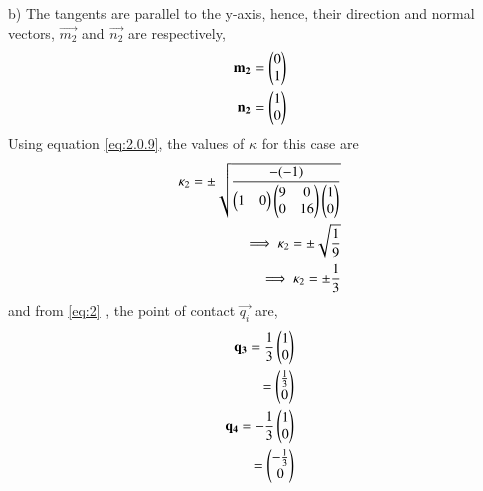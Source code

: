 \documentclass[journal,12pt,twocolumn]{IEEEtran}
\begin{document}
b) The tangents are parallel to the y-axis, hence, their direction and normal vectors, $\vec{m_2}$ and $\vec{n_2}$ are respectively,
\begin{align}
\mathbf{m_2}=\begin{pmatrix}0\\1\end{pmatrix}\\
\mathbf{n_2}=\begin{pmatrix}1\\0\end{pmatrix}
\end{align}
Using equation \eqref{eq:2.0.9}, the values of $\kappa$ for this case are
\begin{align}
     \kappa_2=\pm \sqrt{\frac{-(-1)}{\begin{pmatrix}1 & 0\end{pmatrix}\begin{pmatrix}9 & 0 \\ 0 & 16\end{pmatrix} \begin{pmatrix}1\\0\end{pmatrix}}}\\
 \implies \kappa_2=\pm \sqrt{\frac{1}{9}}\\
    \implies \kappa_2=\pm \frac{1}{3} 
\end{align}
and from \eqref{eq:2} , the point of contact $\vec{q_i}$ are,
\begin{align}
    \mathbf{q_3}=\frac{1}{3}\begin{pmatrix}1\\0\end{pmatrix}\\
    =\begin{pmatrix}\frac{1}{3}\\0\end{pmatrix}\\
    \mathbf{q_4}=-\frac{1}{3}\begin{pmatrix}1\\0\end{pmatrix}\\
    =\begin{pmatrix}-\frac{1}{3}\\0\end{pmatrix}
\end{align}
 
\end{document}
